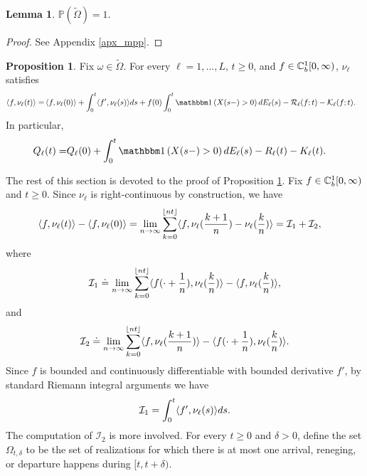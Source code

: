 \documentclass{article}
\theoremstyle{definition}
\newtheorem{lemma}[theorem]{Lemma}
\newtheorem{proposition}[theorem]{Proposition}
\numberwithin{equation}{section}
\begin{document}
\begin{lemma}\label{lem_tomega}
  $\mathbb{P}(\tilde\Omega)=1$.
\end{lemma}

\begin{proof}
  See Appendix \ref{apx_mpp}.
\end{proof}



\begin{proposition}\label{prop_prelim}
Fix $\omega\in\tilde\Omega$. For every $\ell=1,...,L$, $t\geq0$, and $f\in\mathbb{C}_b^{1}[0,\infty)$, $\nu_\ell$ satisfies
\begin{align}\label{prelimit_dynamic}
  \pairil{f}{\nu_\ell(t)}= & \pair{f}{\nu_\ell(0)}+ \int_{0}^{t}\pairil{f'}{\nu_\ell(s)}ds+   f(0)\int_0^t\indic{X(s-)>0}d\arrival_{\ell}(s)  -\renegC_\ell(f;t)-\entryC_\ell(f;t).
\end{align}
In particular,
\begin{align}\label{prelimit_massbalance}
  \ql_\ell(t)= & \ql_\ell(0)+ \int_0^t\indic{X(s-)>0}d\arrival_{\ell}(s)-\reneg_{\ell}(t)-\entry_{\ell}(t).
\end{align}
\end{proposition}

The rest of this section is devoted to the proof of Proposition \ref{prop_prelim}. Fix $f\in\mathbb{C}_b^{1}[0,\infty)$ and $t\geq0$. Since $\nu_\ell$ is right-continuous by construction, we have
\begin{align}\label{deltanu}
    \langle f,\nu_\ell(t)\rangle-\left\langle f , \nu_\ell(0) \right\rangle &=\lim_{n\to\infty}\sum_{k=0}^{\lfloor nt\rfloor} \langle f,\nu_\ell(\frac{k+1}{n})-\nu_\ell(\frac{k}{n})\rangle= \mathcal{I}_1+\mathcal{I}_2,
\end{align}
where
\begin{equation}\label{def_I1}
     \mathcal{I}_1\doteq \lim_{n\to\infty}\sum_{k=0}^{\lfloor nt\rfloor} \langle f(\cdot+\frac{1}{n}),\nu_\ell(\frac{k}{n})\rangle-\langle f,\nu_\ell(\frac{k}{n})\rangle,
\end{equation}
and
\begin{equation}\label{def_I2}
    \mathcal{I}_2 \doteq \lim_{n\to\infty}\sum_{k=0}^{\lfloor nt\rfloor} \langle f,\nu_\ell(\frac{k+1}{n})\rangle-\langle f(\cdot+\frac{1}{n}),\nu_\ell(\frac{k}{n})\rangle.
\end{equation}
Since $f$ is bounded and continuously differentiable with bounded derivative $f'$, by standard Riemann integral arguments we have
\begin{equation}\label{I1}
  \mathcal{I}_1 = \int_{0}^{t}\langle f',\nu_\ell(s)\rangle ds.
\end{equation}
The computation of $\mathcal{I}_2$ is more involved. For every $t\geq0$ and $\delta>0$, define the set $\Omega_{t,\delta}$ to be the set of realizations for which there is at most one arrival, reneging, or departure happens during $[t,t+\delta)$.
\end{document}
